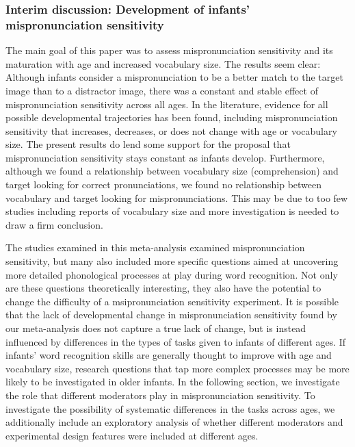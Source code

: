 \documentclass[man]{apa6}
\begin{document}
\hypertarget{interim-discussion-development-of-infants-mispronunciation-sensitivity}{%
\subsubsection{Interim discussion: Development of infants' mispronunciation sensitivity}\label{interim-discussion-development-of-infants-mispronunciation-sensitivity}}

The main goal of this paper was to assess mispronunciation sensitivity and its maturation with age and increased vocabulary size. The results seem clear: Although infants consider a mispronunciation to be a better match to the target image than to a distractor image, there was a constant and stable effect of mispronunciation sensitivity across all ages. In the literature, evidence for all possible developmental trajectories has been found, including mispronunciation sensitivity that increases, decreases, or does not change with age or vocabulary size. The present results do lend some support for the proposal that mispronunciation sensitivity stays constant as infants develop. Furthermore, although we found a relationship between vocabulary size (comprehension) and target looking for correct pronunciations, we found no relationship between vocabulary and target looking for mispronunciations. This may be due to too few studies including reports of vocabulary size and more investigation is needed to draw a firm conclusion.

The studies examined in this meta-analysis examined mispronunciation sensitivity, but many also included more specific questions aimed at uncovering more detailed phonological processes at play during word recognition. Not only are these questions theoretically interesting, they also have the potential to change the difficulty of a msipronunciation sensitivity experiment. It is possible that the lack of developmental change in mispronunciation sensitivity found by our meta-analysis does not capture a true lack of change, but is instead influenced by differences in the types of tasks given to infants of different ages. If infants' word recognition skills are generally thought to improve with age and vocabulary size, research questions that tap more complex processes may be more likely to be investigated in older infants. In the following section, we investigate the role that different moderators play in mispronunciation sensitivity. To investigate the possibility of systematic differences in the tasks across ages, we additionally include an exploratory analysis of whether different moderators and experimental design features were included at different ages.
\end{document}
